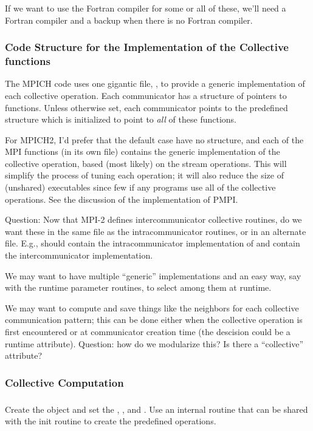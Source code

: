 \documentclass{article}
\begin{document}
If we want to use the Fortran compiler for some or all of these, we'll
need a Fortran compiler and a backup when there is no Fortran compiler.

\subsubsection{Code Structure for the Implementation of the Collective
  functions} 

The MPICH code uses one gigantic file, , to provide a
generic implementation of each collective operation.  Each
communicator has a structure of pointers to functions.  Unless
otherwise set, each communicator points to the predefined structure
 which is
initialized to point to \emph{all} of 
these functions.  

For MPICH2, I'd prefer that the default case have no structure, and
each of the MPI functions (in its own file) contains the generic
implementation of the collective operation, based (most likely) on the
stream operations.  This will simplify the process of tuning each
operation; it will also reduce the size of (unshared) executables since few if
any programs use all of the collective operations.
See the discussion of the implementation of PMPI.

Question: Now that MPI-2 defines intercommunicator collective
routines, do we want these in the same file as the intracommunicator
routines, or in an alternate file.  E.g., should  contain
the intracommunicator implementation of  and
 contain the intercommunicator implementation.

We may want to have multiple ``generic'' implementations and an easy
way, say with the runtime parameter routines, to select among them at runtime.

We may want to compute and save things like the neighbors for each
collective communication pattern; this can be done either when the
collective operation is first encountered or at communicator creation
time (the descision could be a runtime attribute).  Question: how do
we modularize this?  Is there a ``collective'' 
attribute?


\subsubsection{Collective Computation}

\subsubsection{}
Create the object and set the ,
, and .  Use an 
internal routine that can be shared with the init routine to create
the predefined operations.
\end{document}
